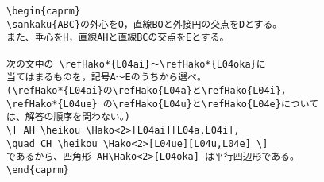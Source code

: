 \begin{verbatim}
\begin{caprm}
\sankaku{ABC}の外心をO，直線BOと外接円の交点をDとする。
また、垂心をH，直線AHと直線BCの交点をEとする。

次の文中の \refHako*{L04ai}〜\refHako*{L04oka}に
当てはまるものを，記号A〜Eのうちから選べ。
(\refHako*{L04ai}の\refHako{L04a}と\refHako{L04i}，
\refHako*{L04ue} の\refHako{L04u}と\refHako{L04e}について
は、解答の順序を問わない。)
\[ AH \heikou \Hako<2>[L04ai][L04a,L04i], 
\quad CH \heikou \Hako<2>[L04ue][L04u,L04e] \]
であるから、四角形 AH\Hako<2>[L04oka] は平行四辺形である。
\end{caprm}
\end{verbatim}
